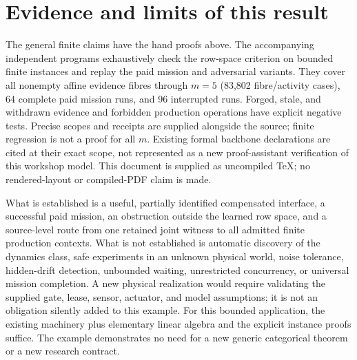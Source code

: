 \documentclass[11pt,a4paper]{article}
\theoremstyle{definition}
\begin{document}
\section{Evidence and limits of this result}

The general finite claims have the hand proofs above. The accompanying
independent programs exhaustively check the row-space criterion on bounded
finite instances and replay the paid mission and adversarial variants.
They cover all nonempty affine evidence fibres through $m=5$ (83,802
fibre/activity cases), 64 complete paid mission runs, and 96 interrupted
runs. Forged, stale, and withdrawn evidence and forbidden production
operations have explicit negative tests. Precise scopes and receipts are
supplied alongside the source; finite regression is not a proof for all $m$. Existing formal backbone declarations
are cited at their exact scope, not represented as a new proof-assistant
verification of this workshop model. This document is supplied as
uncompiled TeX; no rendered-layout or compiled-PDF claim is made.

What is established is a useful, partially identified compensated interface,
a successful paid mission, an obstruction outside the learned row space,
and a source-level route from one retained joint witness to all admitted
finite production contexts. What is not established is automatic discovery
of the dynamics class, safe experiments in an unknown physical world,
noise tolerance, hidden-drift detection, unbounded waiting, unrestricted
concurrency, or universal mission completion. A new physical realization
would require validating the supplied gate, lease, sensor, actuator, and
model assumptions; it is not an obligation silently added to this example.
For this bounded application, the existing machinery plus elementary
linear algebra and the explicit instance proofs suffice. The example
demonstrates no need for a new generic categorical theorem or a new
research contract.
\end{document}
